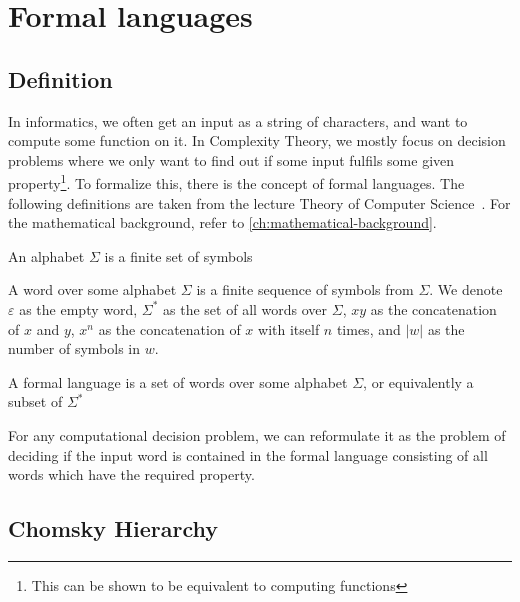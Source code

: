\chapter{Formal languages}\label{ch:formal-languages}


\section{Definition}\label{sec:definition}

In informatics, we often get an input as a string of characters, and want to compute some function on it.
In Complexity Theory, we mostly focus on decision problems where we only want to find out if some input fulfils some given property\footnote{This can be shown to be equivalent to computing functions}.
To formalize this, there is the concept of formal languages.
The following definitions are taken from the lecture Theory of Computer Science~\cite{theory-cs}.
For the mathematical background, refer to \autoref{ch:mathematical-background}.

\begin{define}[Alphabet]
    An alphabet $\Sigma$ is a finite set of symbols
\end{define}

\begin{define}[Word]
    A word over some alphabet $\Sigma$ is a finite sequence of symbols from $\Sigma$.
    We denote $\varepsilon$ as the empty word, $\Sigma^*$ as the set of all words over $\Sigma$, $xy$ as the concatenation of $x$ and $y$, $x^{n}$ as the concatenation of $x$ with itself $n$ times, and $|w|$ as the number of symbols in $w$.
\end{define}

\begin{define}
    A formal language is a set of words over some alphabet $\Sigma$, or equivalently a subset of $\Sigma^*$
\end{define}

For any computational decision problem, we can reformulate it as the problem of deciding if the input word is contained in the formal language consisting of all words which have the required property.


\section{Chomsky Hierarchy}\label{sec:chromsky-hierarchy}

